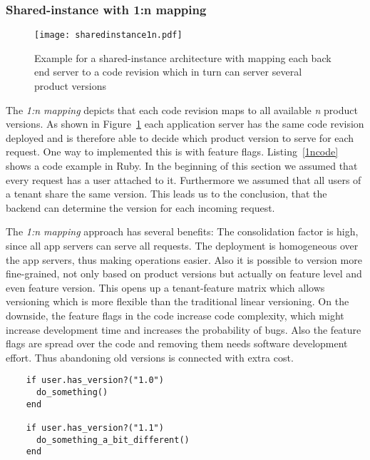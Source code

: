 \subsubsection{Shared-instance with 1:n mapping}
\label{sec:shared1n}

\begin{figure}[h!]
\centering
\texttt{[image: sharedinstance1n.pdf]}
\caption{Example for a shared-instance architecture with mapping each back end server to a code revision which in turn can server several product versions}
\label{fig:sharedinstance1n}
\vspace{-20pt}
\end{figure}

The \emph{1:n mapping} depicts that each code revision maps to all available \emph{n} product versions. As shown in Figure~\ref{fig:sharedinstance1n} each application server has the same code revision deployed and is therefore able to decide which product version to serve for each request. One way to implemented this is with feature flags. Listing~\ref{1ncode} shows a code example in Ruby. In the beginning of this section we assumed that every request has a user attached to it. Furthermore we assumed that all users of a tenant share the same version. This leads us to the conclusion, that the backend can determine the version for each incoming request.

The \emph{1:n mapping} approach has several benefits: The consolidation factor is high, since all app servers can serve all requests. The deployment is homogeneous over the app servers, thus making operations easier. Also it is possible to version more fine-grained, not only based on product versions but actually on feature level and even feature version. This opens up a tenant-feature matrix which allows versioning which is more flexible than the traditional linear versioning.
On the downside, the feature flags in the code increase code complexity, which might increase development time and increases the probability of bugs. Also the feature flags are spread over the code and removing them needs software development effort. Thus abandoning old versions is connected with extra cost.

\noindent\begin{minipage}{\textwidth}
  \begin{lstlisting}
    if user.has_version?("1.0")
      do_something()
    end

    if user.has_version?("1.1")
      do_something_a_bit_different()
    end
  \end{lstlisting}
  \vspace{-20pt}
\end{minipage}



